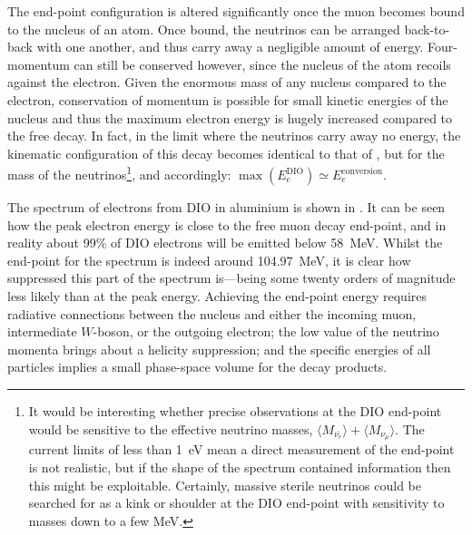 The end-point configuration is altered significantly once the muon becomes bound to the nucleus of an atom.
Once bound, the neutrinos can be arranged back-to-back with one another, and thus carry away a negligible amount of energy.
Four-momentum can still be conserved however, since the nucleus of the atom recoils against the electron.  
Given the enormous mass of any nucleus compared to the electron, conservation of momentum is possible for small kinetic energies of the nucleus and thus the maximum electron energy is hugely increased compared to the free decay.
In fact, in the limit where the neutrinos carry away no energy, the kinematic configuration of this decay becomes identical to that of \mueconv, but for the mass of the neutrinos\footnote{
It would be interesting whether precise observations at the DIO end-point would be sensitive to the effective neutrino masses, $\langle M_{\bar{\nu_{e}}}\rangle+\langle M_{\nu_{\mu}}\rangle$.
The current limits of less than 1~eV mean a direct measurement of the end-point is not realistic, but if the shape of the spectrum contained information then this might be exploitable.
Certainly, massive sterile neutrinos could be searched for as a kink or shoulder at the DIO end-point with sensitivity to masses down to a few MeV.
}, and accordingly: $\max(E_{e}^\textrm{DIO})\simeq{}E_{e}^\textrm{conversion}$.
\FigDecayInOrbitSpectrum

The spectrum of electrons from \ac{DIO} in aluminium is shown in .
It can be seen how the peak electron energy is close to the free muon decay end-point, and in reality about 99\% of \ac{DIO} electrons will be emitted below 58~MeV.
Whilst the end-point for the spectrum is indeed around 104.97~MeV, it is clear how suppressed this part of the spectrum is---being some twenty orders of magnitude less likely than at the peak energy.
Achieving the end-point energy requires radiative connections between the nucleus and either the incoming muon, intermediate $W$-boson, or the outgoing electron; the low value of the neutrino momenta brings about a helicity suppression; and the specific energies of all particles implies a small phase-space volume for the decay products.

